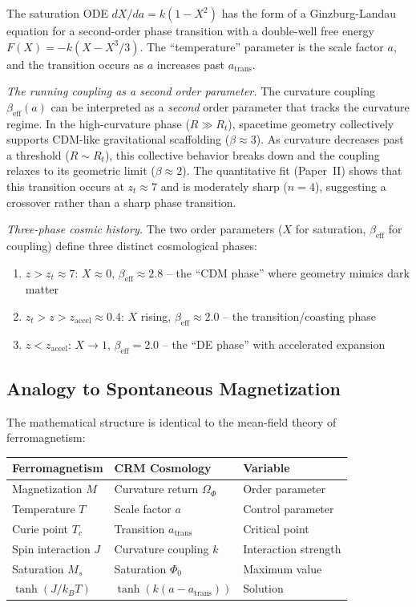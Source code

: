 \documentclass[aps,prd,twocolumn,superscriptaddress,nofootinbib]{revtex4-2}
\begin{document}
The saturation ODE $dX/da = k(1 - X^2)$ has the form of a Ginzburg-Landau equation for a second-order phase transition with a double-well free energy $F(X) = -k(X - X^3/3)$. The ``temperature'' parameter is the scale factor $a$, and the transition occurs as $a$ increases past $a_{\mathrm{trans}}$.

\textit{The running coupling as a second order parameter.} The curvature coupling $\beta_{\mathrm{eff}}(a)$ can be interpreted as a \textit{second} order parameter that tracks the curvature regime. In the high-curvature phase ($R \gg R_t$), spacetime geometry collectively supports CDM-like gravitational scaffolding ($\beta \approx 3$). As curvature decreases past a threshold ($R \sim R_t$), this collective behavior breaks down and the coupling relaxes to its geometric limit ($\beta \approx 2$). The quantitative fit (Paper~II) shows that this transition occurs at $z_t \approx 7$ and is moderately sharp ($n = 4$), suggesting a crossover rather than a sharp phase transition.

\textit{Three-phase cosmic history.} The two order parameters ($X$ for saturation, $\beta_{\mathrm{eff}}$ for coupling) define three distinct cosmological phases:
\begin{enumerate}
\item $z > z_t \approx 7$: $X \approx 0$, $\beta_{\mathrm{eff}} \approx 2.8$ -- the ``CDM phase'' where geometry mimics dark matter
\item $z_t > z > z_{\mathrm{accel}} \approx 0.4$: $X$ rising, $\beta_{\mathrm{eff}} \approx 2.0$ -- the transition/coasting phase
\item $z < z_{\mathrm{accel}}$: $X \to 1$, $\beta_{\mathrm{eff}} = 2.0$ -- the ``DE phase'' with accelerated expansion
\end{enumerate}

\subsection{Analogy to Spontaneous Magnetization}

The mathematical structure is identical to the mean-field theory of ferromagnetism:
\begin{table}[tbp]
\centering
\begin{tabular}{lll}
\toprule
\textbf{Ferromagnetism} & \textbf{CRM Cosmology} & \textbf{Variable} \\
\midrule
Magnetization $M$ & Curvature return $\Omega_\Phi$ & Order parameter \\
Temperature $T$ & Scale factor $a$ & Control parameter \\
Curie point $T_c$ & Transition $a_{\mathrm{trans}}$ & Critical point \\
Spin interaction $J$ & Curvature coupling $k$ & Interaction strength \\
Saturation $M_s$ & Saturation $\Phi_0$ & Maximum value \\
$\tanh(J/k_BT)$ & $\tanh(k(a - a_{\mathrm{trans}}))$ & Solution \\
\bottomrule
\end{tabular}
\end{table}
\end{document}
